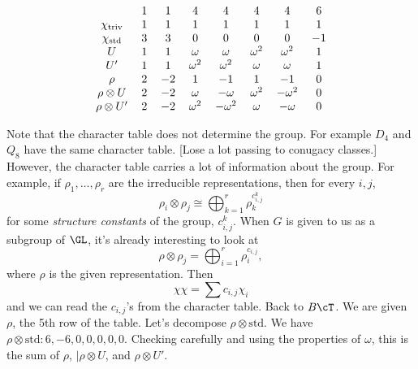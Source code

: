 \begin{ex}
\begin{enumerate}[(i)]
	\[
	\begin{tabular}{cccccccc}
	& 1 & 1 & 4 & 4 & 4 & 4 & 6 \\
	$\chi_{\text{triv}}$  & 1 & 1 & 1 & 1 & 1 & 1 & 1 \\
	$\chi_{\text{std}}$  & 3 & 3 & 0 & 0 & 0 & 0 & $-1$ \\
	$U$ & 1 & 1 & $\omega$ & $\omega$ & $\omega^2$ & $\omega^2$ & 1 \\
	$U'$ & 1 & 1 & $\omega^2$ & $\omega^2$ & $\omega$ & $\omega$ & 1 \\
	$\rho$ & 2 & $-2$ & 1 & $-1$ & 1 & $-1$ & 0 \\
	$\rho \otimes U$ & 2& $-2$ & $\omega$ & $-\omega$ & $\omega^2$ & $-\omega^2$ & 0 \\
	$\rho \otimes U'$ & 2 & $-2$ & $\omega^2$ & $-\omega^2$ & $\omega$ & $-\omega$ & 0
	\end{tabular}
	\]
\end{enumerate}
\end{ex}



Note that the character table does not determine the group. For example $D_4$ and $Q_8$ have the same character table. [Lose a lot passing to conugacy classes.] However, the character table carries a lot of information about the group. For example, if $\rho_1,\ldots,\rho_r$ are the irreducible representations, then for every $i,j$, 
	\[
	\rho_i \otimes \rho_j \cong \bigoplus_{k=1}^r \rho_k^{c_{i,j}^k}
	\]
for some \emph{structure constants} of the group, $c_{i,j}^k$. When $G$ is given to us as a subgroup of $\GL$, it's already interesting to look at
	\[
	\rho \otimes \rho_j = \bigoplus_{i=1}^r \rho_i^{c_{i,j}},
	\]
where $\rho$ is the given representation. Then
	\[
	\chi \chi = \sum c_{i,j} \chi_i
	\]
and we can read the $c_{i,j}$'s from the character table. Back to $B\cT$. We are given $\rho$, the 5th row of the table. Let's decompose $\rho \otimes \text{std}$. We have $\rho \otimes \text{std}: 6,-6,0,0,0,0,0$. Checking carefully and using the properties of $\omega$, this is the sum of $\rho$, $|\rho \otimes U$, and $\rho \otimes U'$. 



